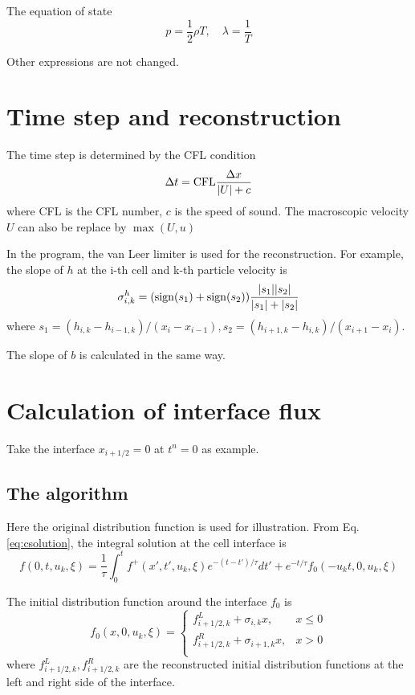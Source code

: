 \documentclass[a4paper]{book}
\begin{document}
The equation of state
\begin{equation} 
    \label{eq:eos}
    p=\frac{1}{2}\rho T,\quad \lambda=\frac{1}{T}
\end{equation}

Other expressions are not changed.

\section{Time step and reconstruction}
The time step is determined by the CFL condition
\begin{equation} 
    \Delta t={\rm CFL}\frac{\Delta x}{|U|+c}
\end{equation}
where CFL is the CFL number, $c$ is the speed of sound. The macroscopic velocity $U$ can also be replace by $\max(U,u)$

In the program, the van Leer limiter is used for the reconstruction. For example, the slope of $h$ at the i-th cell and k-th particle velocity is
\begin{equation} 
    \sigma_{i,k}^h = ({\rm sign}(s_1)+{\rm sign}(s_2))\frac{|s_1||s_2|}{|s_1|+|s_2|}
\end{equation}
where $s_1=(h_{i,k}-h_{i-1,k})/(x_i-x_{i-1}), s_2=(h_{i+1,k}-h_{i,k})/(x_{i+1}-x_{i})$.

The slope of $b$ is calculated in the same way.

\section{Calculation of interface flux}
Take the interface $x_{i+1/2}=0$ at $t^n=0$ as example.

\subsection{The algorithm}
Here the original distribution function is used for illustration. From Eq. \ref{eq:csolution}, the integral solution at the cell interface is
\begin{equation}
    \label{eq:csolution_interface}
    f(0,t,u_k,\xi)=\frac{1}{\tau}\int_{0}^t f^+(x',t',u_k,\xi)e^{-(t-t')/\tau}dt'+e^{-t/\tau}f_0(-u_kt,0,u_k,\xi)
\end{equation}

The initial distribution function around the interface $f_0$ is
\begin{equation}
    \label{eq:f0}
    f_0(x,0,u_k,\xi) = 
    \begin{cases}
        f_{i+1/2,k}^L+\sigma_{i,k}x,& x\leqslant 0\\ 
        f_{i+1/2,k}^R+\sigma_{i+1,k}x,& x> 0\\ 
    \end{cases}
\end{equation}
where $f_{i+1/2,k}^L, f_{i+1/2,k}^R$ are the reconstructed initial distribution functions at the left and right side of the interface.
\end{document}
